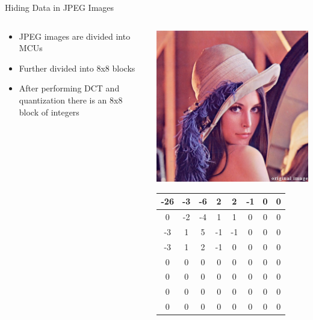 \begin{frame}{Hiding Data in JPEG Images}{}
	\begin{minipage}[0.5\textheight]{\textwidth}
		\begin{columns}[T]
			\begin{column}{0.5\textwidth}
				\vspace{.56mm}
				\begin{itemize}
					\item JPEG images are divided into MCUs
					\item Further divided into 8x8 blocks
					\item After performing DCT and quantization there is an 8x8 block of integers
				\end{itemize}
			\end{column}
			\begin{column}{0.5\textwidth}
				\begin{center}
					\includegraphics[width=.5\textwidth]{figures/lena_color.jpg}
				\end{center}
				{\tiny \begin{table}[]
				\centering
					\begin{tabular}{|c|c|c|c|c|c|c|c|}
					\hline
					-26 & -3 & -6 & 2  & 2  & -1 & 0 & 0 \\ \hline
					0   & -2 & -4 & 1  & 1  & 0  & 0 & 0 \\ \hline
					-3  & 1  & 5  & -1 & -1 & 0  & 0 & 0 \\ \hline
					-3  & 1  & 2  & -1 & 0  & 0  & 0 & 0 \\ \hline
					0   & 0  & 0  & 0  & 0  & 0  & 0 & 0 \\ \hline
					0   & 0  & 0  & 0  & 0  & 0  & 0 & 0 \\ \hline
					0   & 0  & 0  & 0  & 0  & 0  & 0 & 0 \\ \hline
					0   & 0  & 0  & 0  & 0  & 0  & 0 & 0 \\ \hline
					\end{tabular}
				\end{table}
				}
			\end{column}
		\end{columns}
	\end{minipage}
\end{frame}


